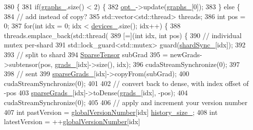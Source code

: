 \begin{DoxyCode}
380                                          \{
381     \textcolor{keywordflow}{if}(\hyperlink{classmarian_1_1AsyncGraphGroup_a3fbad41763c988a5723a39c2220287d8}{graphs\_}.size() < 2) \{
382       \hyperlink{classmarian_1_1GraphGroup_acc7e9b90d489d561de842e5b64ec751a}{opt\_}->update(\hyperlink{classmarian_1_1AsyncGraphGroup_a3fbad41763c988a5723a39c2220287d8}{graphs\_}[0]);
383     \} \textcolor{keywordflow}{else} \{
384       \textcolor{comment}{// add instead of copy?}
385       std::vector<std::thread> threads;
386       \textcolor{keywordtype}{int} pos = 0;
387       \textcolor{keywordflow}{for}(\textcolor{keywordtype}{int} idx = 0; idx < \hyperlink{classmarian_1_1AsyncGraphGroup_a9fcc6fe896fe0c623a1cde656c6e123e}{devices\_}.size(); idx++) \{
388         threads.emplace\_back(std::thread(
389             [=](\textcolor{keywordtype}{int} idx, \textcolor{keywordtype}{int} pos) \{
390               \textcolor{comment}{// individual mutex per-shard}
391               std::lock\_guard<std::mutex> guard(\hyperlink{classmarian_1_1AsyncGraphGroup_a5bf268b84c19070341c67f9c8617b1b2}{shardSync\_}[idx]);
392 
393               \textcolor{comment}{// split to shard}
394               \hyperlink{namespacemarian_a5484064f1fce2661d0b27a5c02a9392b}{SparseTensor} subGrad
395                   = newGrads->subtensor(pos, \hyperlink{classmarian_1_1AsyncGraphGroup_ad2f8bc6900976be4426acc4631d07145}{grads\_}[idx]->size(), idx);
396               cudaStreamSynchronize(0);
397 
398               \textcolor{comment}{// sent}
399               \hyperlink{classmarian_1_1AsyncGraphGroup_a8270ea17d3e0ad0288686ecf8680b761}{sparseGrads\_}[idx]->copyFrom(subGrad);
400               cudaStreamSynchronize(0);
401 
402               \textcolor{comment}{// convert back to dense, with index offset of -pos}
403               \hyperlink{classmarian_1_1AsyncGraphGroup_a8270ea17d3e0ad0288686ecf8680b761}{sparseGrads\_}[idx]->toDense(\hyperlink{classmarian_1_1AsyncGraphGroup_ad2f8bc6900976be4426acc4631d07145}{grads\_}[idx], -pos);
404               cudaStreamSynchronize(0);
405 
406               \textcolor{comment}{// apply and increment your version number}
407               \textcolor{keywordtype}{int} pastVersion = \hyperlink{classmarian_1_1AsyncGraphGroup_a75884703e6fe8efb3c75293eb912bce4}{globalVersionNumber}[idx] %
      \hyperlink{classmarian_1_1AsyncGraphGroup_a0958c1384fc7486dd4f739d69c9ac636}{history\_size\_};
408               \textcolor{keywordtype}{int} latestVersion = ++\hyperlink{classmarian_1_1AsyncGraphGroup_a75884703e6fe8efb3c75293eb912bce4}{globalVersionNumber}[idx] %

\end{DoxyCode}
